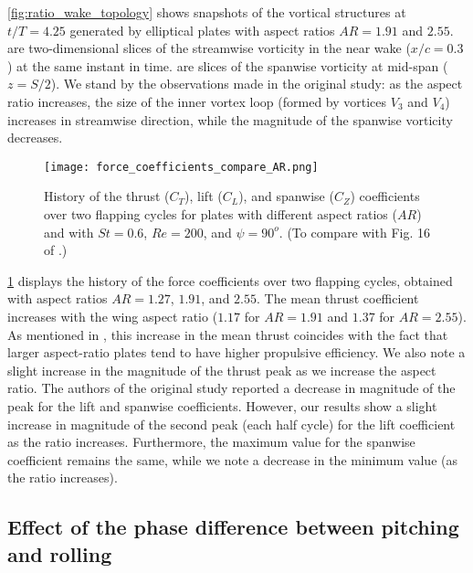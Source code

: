 \cref{fig:ratio_wake_topology} shows snapshots of the vortical structures at $t/T = 4.25$ generated by elliptical plates with aspect ratios $AR = 1.91$ and $2.55$.
 are two-dimensional slices of the streamwise vorticity in the near wake ($x/c = 0.3$) at the same instant in time.
 are slices of the spanwise vorticity at mid-span ($z = S/2$).
We stand by the observations made in the original study: as the aspect ratio increases, the size of the inner vortex loop (formed by vortices $V_3$ and $V_4$) increases in streamwise direction, while the magnitude of the spanwise vorticity decreases.

\begin{figure}[!h]
  \centering
  \texttt{[image: force\_coefficients\_compare\_AR.png]}
  \caption{History of the thrust ($C_T$), lift ($C_L$), and spanwise ($C_Z$) coefficients over two flapping cycles for plates with different aspect ratios ($AR$) and with $St = 0.6$, $Re = 200$, and $\psi = 90^o$. (To compare with Fig. 16 of \citet{li_dong_2016}.)}
  \label{fig:ratio_force_coefficients}
\end{figure}

\cref{fig:ratio_force_coefficients} displays the history of the force coefficients over two flapping cycles, obtained with aspect ratios $AR = 1.27$, $1.91$, and $2.55$.
The mean thrust coefficient increases with the wing aspect ratio ($1.17$ for $AR = 1.91$ and $1.37$ for $AR = 2.55$).
As mentioned in \citet{li_dong_2016}, this increase in the mean thrust coincides with the fact that larger aspect-ratio plates tend to have higher propulsive efficiency.
We also note a slight increase in the magnitude of the thrust peak as we increase the aspect ratio.
The authors of the original study reported a decrease in magnitude of the peak for the lift and spanwise coefficients.
However, our results show a slight increase in magnitude of the second peak (each half cycle) for the lift coefficient as the ratio increases.
Furthermore, the maximum value for the spanwise coefficient remains the same, while we note a decrease in the minimum value (as the ratio increases).

\subsection{Effect of the phase difference between pitching and rolling}

